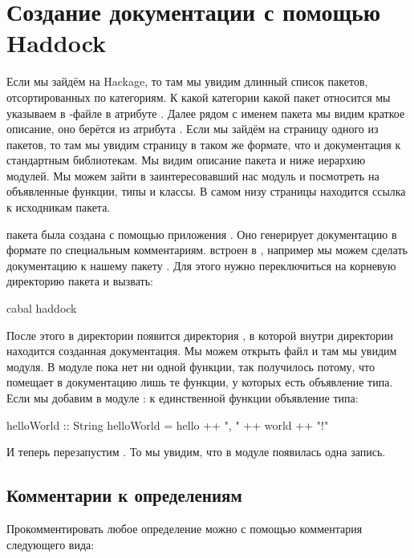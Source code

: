 \section{Создание документации с помощью Haddock}

Если мы зайдём на Hackage, то там мы увидим длинный
список пакетов, отсортированных по категориям. 
К какой категории какой пакет относится мы указываем
в -файле в атрибуте . Далее рядом 
с именем пакета
мы видим краткое описание, оно берётся из атрибута . 
Если мы зайдём 
на страницу одного из пакетов, то там мы увидим
страницу в таком же формате, что и документация
к стандартным библиотекам. Мы видим описание пакета
и ниже иерархию модулей. Мы можем зайти в заинтересовавший
нас модуль и посмотреть на объявленные функции, типы 
и классы. В самом низу страницы находится ссылка к
исходникам пакета. 

 пакета была создана с помощью
приложения . Оно генерирует документацию
в формате  по специальным комментариям.
 встроен в , например мы можем
сделать документацию к нашему пакету . 
Для этого нужно переключиться на корневую директорию
пакета и вызвать:

\begin{code}
cabal haddock
\end{code}

После этого в директории  появится директория
, в которой внутри директории  находится
созданная документация. Мы можем открыть файл 
и там мы увидим  модуля. В модуле пока
нет ни одной функции, так получилось потому, что 
помещает в документацию лишь те функции, у которых есть 
объявление типа. Если мы добавим в модуле :
к единственной функции объявление типа:

\begin{code}
helloWorld :: String
helloWorld = hello ++ ", " ++ world ++ "!"
\end{code}

И теперь перезапустим . То мы увидим, что
в модуле   появилась одна запись. 

\subsection{Комментарии к определениям}

Прокомментировать любое определение можно с помощью
комментария следующего вида:

